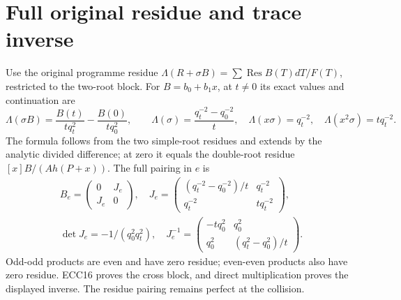 \documentclass[11pt]{article}
\providecommand{\Res}{\operatorname{Res}}
\begin{document}
\section{Full original residue and trace inverse}
Use the original programme residue
$\Lambda(R+\sigma B)=\sum\Res B(T)dT/F(T)$, restricted to the two-root
block. For $B=b_0+b_1x$, at $t\ne0$ its exact values and continuation are
\begin{equation}
 \Lambda(\sigma B)=\frac{B(t)}{tq_t^2}-\frac{B(0)}{tq_0^2},\qquad
 \Lambda(\sigma)=\frac{q_t^{-2}-q_0^{-2}}t,\quad
 \Lambda(x\sigma)=q_t^{-2},\quad
 \Lambda(x^2\sigma)=tq_t^{-2}.
 \tag{ECC16}
\end{equation}
The formula follows from the two simple-root residues and extends by
the analytic divided difference; at zero it equals the double-root
residue $[x]B/(Ah(P+x))$. The full pairing in $e$ is
\begin{equation}
 \begin{gathered}
 B_e=\begin{pmatrix}0&J_e\\J_e&0\end{pmatrix},\quad
 J_e=\begin{pmatrix}(q_t^{-2}-q_0^{-2})/t&q_t^{-2}\\
 q_t^{-2}&tq_t^{-2}\end{pmatrix},\\
 \det J_e=-1/(q_0^2q_t^2),\quad
 J_e^{-1}=\begin{pmatrix}-tq_0^2&q_0^2\\
 q_0^2&(q_t^2-q_0^2)/t\end{pmatrix}.
 \end{gathered}
 \tag{ECC17}
\end{equation}
Odd-odd products are even and have zero residue; even-even products
also have zero residue. ECC16 proves the cross block, and direct
multiplication proves the displayed inverse. The residue pairing remains
perfect at the collision.
\end{document}
